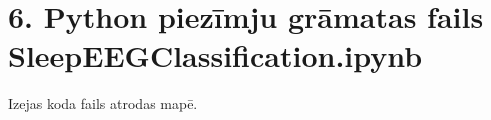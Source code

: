 \documentclass[12pt,paper=A4]{report}
\newcounter{nofappendices}
\begin{document}
\section*{6. Python piezīmju grāmatas fails SleepEEGClassification.ipynb}
\addtocounter{nofappendices}{1}
Izejas koda fails atrodas  mapē.

%

\end{document}
